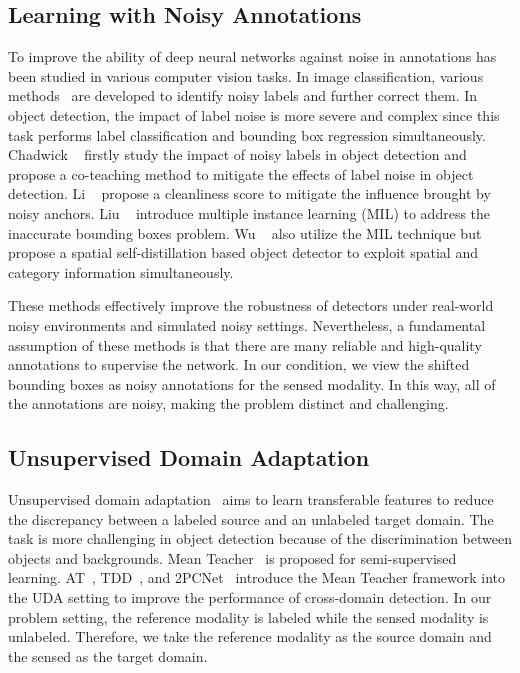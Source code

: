 \subsection{Learning with Noisy Annotations}
To improve the ability of deep neural networks against noise in annotations has been studied in various computer vision tasks. In image classification, various methods~\cite{yi2019probabilistic,zheng2021meta} are developed to identify noisy labels and further correct them. In object detection, the impact of label noise is more severe and complex since this task performs label classification and bounding box regression simultaneously. Chadwick \etal~\cite{chadwick2019training} firstly study the impact of noisy labels in object detection and propose a co-teaching method to mitigate the effects of label noise in object detection. Li \etal~\cite{li2020learning} propose a cleanliness score to mitigate the influence brought by noisy anchors. Liu \etal~\cite{liu2022robust} introduce multiple instance learning (MIL) to address the inaccurate bounding boxes problem. Wu \etal~\cite{wu2023spatial} also utilize the MIL technique but propose a spatial self-distillation based object detector to exploit spatial and category information simultaneously. 

These methods effectively improve the robustness of detectors under real-world noisy environments and simulated noisy settings. Nevertheless, a fundamental assumption of these methods is that there are many reliable and high-quality annotations to supervise the network. In our condition, we view the shifted bounding boxes as noisy annotations for the sensed modality. In this way, all of the annotations are noisy, making the problem distinct and challenging. 

\subsection{Unsupervised Domain Adaptation}
Unsupervised domain adaptation~\cite{li2022cross,he2022cross,kennerley20232pcnet,chen2023confidence,zhai2024maximizing} aims to learn transferable features to reduce the discrepancy between a labeled source and an unlabeled target domain. The task is more challenging in object detection because of the discrimination between objects and backgrounds. Mean Teacher~\cite{tarvainen2017mean} is proposed for semi-supervised learning. AT~\cite{li2022cross}, TDD~\cite{he2022cross}, and 2PCNet~\cite{kennerley20232pcnet} introduce the Mean Teacher framework into the UDA setting to improve the performance of cross-domain detection. In our problem setting, the reference modality is labeled while the sensed modality is unlabeled. Therefore, we take the reference modality as the source domain and the sensed as the target domain.